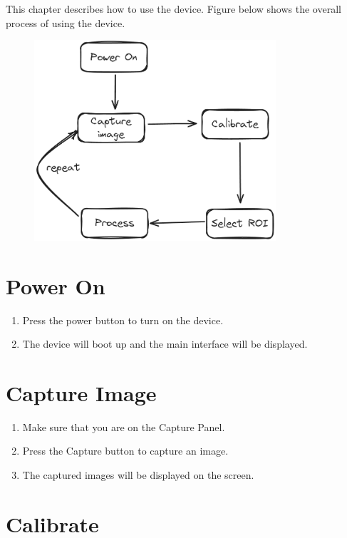 This chapter describes how to use the device. Figure below shows the overall process of using the device.

\begin{figure}[H]
    \centering
    \includegraphics[width=0.8\textwidth]{texs/chapter1/image/overall.png}
\end{figure}

\section{Power On}

\begin{enumerate}
    \item Press the power button to turn on the device.
    \item The device will boot up and the main interface will be displayed.
\end{enumerate}

\section{Capture Image}

\begin{enumerate}
    \item Make sure that you are on the Capture Panel.
    \item Press the Capture button to capture an image.
    \item The captured images will be displayed on the screen.
\end{enumerate}

\section{Calibrate}


